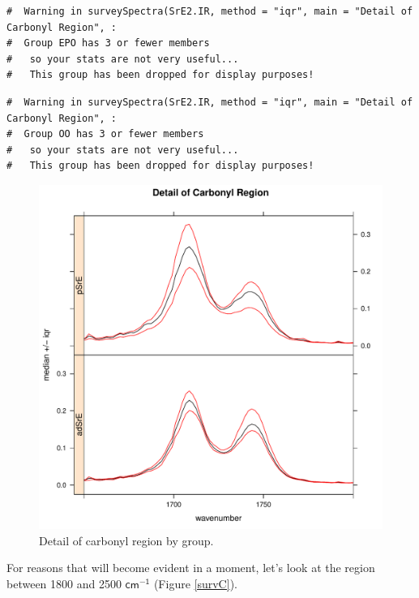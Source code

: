 \documentclass[letter,10pt,twocolumn,twoside,printwatermark=false]{pinp}
\begin{document}
\begin{ShadedResult}
\begin{verbatim}
#  Warning in surveySpectra(SrE2.IR, method = "iqr", main = "Detail of Carbonyl Region", : 
#  Group EPO has 3 or fewer members
#   so your stats are not very useful...
#   This group has been dropped for display purposes!
\end{verbatim}
\end{ShadedResult}
\begin{ShadedResult}
\begin{verbatim}
#  Warning in surveySpectra(SrE2.IR, method = "iqr", main = "Detail of Carbonyl Region", : 
#  Group OO has 3 or fewer members
#   so your stats are not very useful...
#   This group has been dropped for display purposes!
\end{verbatim}
\end{ShadedResult}
\begin{figure}

{\centering \includegraphics[width=\linewidth,height=\linewidth]{ChemoSpec2_files/figure-latex/Chunk14b-1} 

}

\caption{\label{survB}Detail of carbonyl region by group.}\label{fig:Chunk14b}
\end{figure}

For reasons that will become evident in a moment, let's look at the
region between 1800 and 2500 \(\mathsf{cm^{-1}}\) (Figure \ref{survC}).
\end{document}
